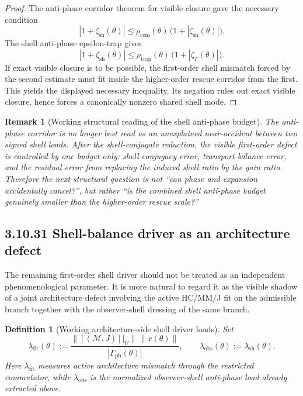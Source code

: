 \documentclass[12pt,a4paper]{article}
\newtheorem{definition}[theorem]{Definition}
\newtheorem{remark}[theorem]{Remark}
\begin{document}
\begin{proof}
The anti-phase corridor theorem for visible closure gave the necessary condition
\[
 |1+\zeta_{\mathrm{sh}}(\theta)|
 \le
 \rho_{\mathrm{rem}}(\theta)\,\bigl(1+|\zeta_{\mathrm{sh}}(\theta)|\bigr).
\]
The shell anti-phase epsilon-trap gives
\[
 |1+\zeta_{\mathrm{sh}}(\theta)|
 \le
 \rho_{\mathrm{trap}}(\theta)\,\bigl(1+|\zeta_{\Gamma}(\theta)|\bigr).
\]
If exact visible closure is to be possible, the first-order shell mismatch forced by the second estimate must fit inside the higher-order rescue corridor from the first. This yields the displayed necessary inequality. Its negation rules out exact visible closure, hence forces a canonically nonzero shared shell mode.
\end{proof}

\begin{remark}[Working structural reading of the shell anti-phase budget]
The anti-phase corridor is no longer best read as an unexplained near-accident between two signed shell loads. After the shell-conjugate reduction, the visible first-order defect is controlled by one budget only: shell-conjugacy error, transport-balance error, and the residual error from replacing the induced shell ratio by the gain ratio. Therefore the next structural question is not ``can phase and expansion accidentally cancel?'', but rather ``is the combined shell anti-phase budget genuinely smaller than the higher-order rescue scale?''
\end{remark}



\subsection*{3.10.31 Shell-balance driver as an architecture defect}
The remaining first-order shell driver should not be treated as an independent phenomenological parameter. It is more natural to regard it as the visible shadow of a joint architecture defect involving the active HC/MM/J fit on the admissible branch together with the observer-shell dressing of the same branch.

\begin{definition}[Working architecture-side shell driver loads]
Set
\[
 \lambda_{\mathrm{fit}}(\theta)
 :=
 \frac{\|[(\mathcal M,J)]|_{U}\|\,\|x(\theta)\|}{|\Gamma_{\mathrm{ph}}(\theta)|},
 \qquad
 \lambda_{\mathrm{obs}}(\theta):=\lambda_{\mathrm{sh}}(\theta).
\]
Here \(\lambda_{\mathrm{fit}}\) measures active architecture mismatch through the restricted commutator, while \(\lambda_{\mathrm{obs}}\) is the normalized observer-shell anti-phase load already extracted above.
\end{definition}
\end{document}
